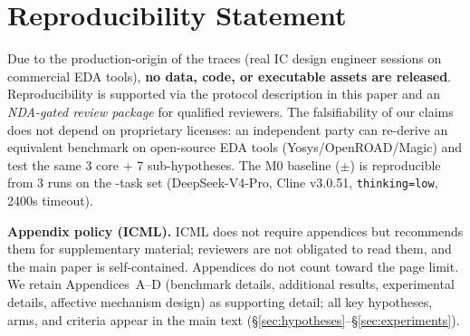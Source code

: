 \section{Reproducibility Statement}
\label{sec:reproducibility}

Due to the production-origin of the traces (real IC design engineer sessions on commercial EDA tools), \textbf{no data, code, or executable assets are released}. Reproducibility is supported via the protocol description in this paper and an \emph{NDA-gated review package} for qualified reviewers. The falsifiability of our claims does not depend on proprietary licenses: an independent party can re-derive an equivalent benchmark on open-source EDA tools (Yosys/OpenROAD/Magic) and test the same 3 core + 7 sub-hypotheses. The M0 baseline (\MzeroPass{}$\pm$\MzeroStd{}) is reproducible from 3 runs on the \Ncases{}-task set (DeepSeek-V4-Pro, Cline v3.0.51, \texttt{thinking=low}, 2400s timeout).

\textbf{Appendix policy (ICML).} ICML does not require appendices but recommends them for supplementary material; reviewers are not obligated to read them, and the main paper is self-contained. Appendices do not count toward the page limit. We retain Appendices~A--D (benchmark details, additional results, experimental details, affective mechanism design) as supporting detail; all key hypotheses, arms, and criteria appear in the main text (\S\ref{sec:hypotheses}--\S\ref{sec:experiments}).
